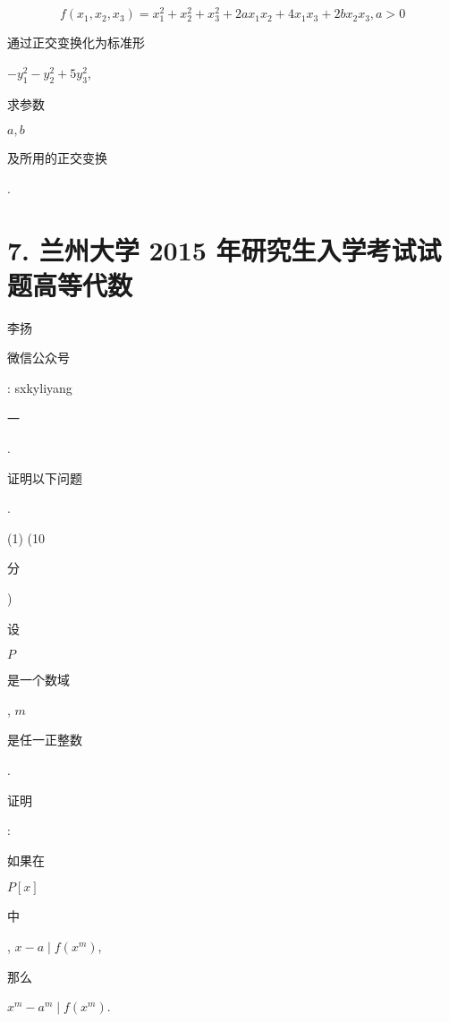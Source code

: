 \documentclass[10pt]{article}
\begin{document}
$$
f\left(x_{1}, x_{2}, x_{3}\right)=x_{1}^{2}+x_{2}^{2}+x_{3}^{2}+2 a x_{1} x_{2}+4 x_{1} x_{3}+2 b x_{2} x_{3}, a>0
$$
\begin{CJK}{UTF8}{mj}通过正交变换化为标准形\end{CJK} $-y_{1}^{2}-y_{2}^{2}+5 y_{3}^{2}$, \begin{CJK}{UTF8}{mj}求参数\end{CJK} $a, b$ \begin{CJK}{UTF8}{mj}及所用的正交变换\end{CJK}.

\section{7. 兰州大学 2015 年研究生入学考试试题高等代数}
\begin{CJK}{UTF8}{mj}李扬\end{CJK}

\begin{CJK}{UTF8}{mj}微信公众号\end{CJK}: sxkyliyang

\begin{CJK}{UTF8}{mj}一\end{CJK}. \begin{CJK}{UTF8}{mj}证明以下问题\end{CJK}.

(1) (10 \begin{CJK}{UTF8}{mj}分\end{CJK}) \begin{CJK}{UTF8}{mj}设\end{CJK} $P$ \begin{CJK}{UTF8}{mj}是一个数域\end{CJK}, $m$ \begin{CJK}{UTF8}{mj}是任一正整数\end{CJK}. \begin{CJK}{UTF8}{mj}证明\end{CJK}: \begin{CJK}{UTF8}{mj}如果在\end{CJK} $P[x]$ \begin{CJK}{UTF8}{mj}中\end{CJK}, $x-a \mid f\left(x^{m}\right)$, \begin{CJK}{UTF8}{mj}那么\end{CJK} $x^{m}-a^{m} \mid f\left(x^{m}\right)$.
\end{document}
